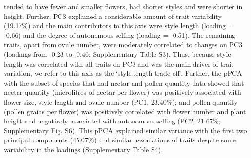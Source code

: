 \documentclass[12pt,a4paper,]{article}
\begin{document}
tended to have fewer and smaller flowers, had shorter styles and were
shorter in height. Further, PC3 explained a considerable amount of trait
variability (19.17\%) and the main contributors to this axis were style
length (loading = -0.66) and the degree of autonomous selfing (loading =
-0.51). The remaining traits, apart from ovule number, were moderately
correlated to changes on PC3 (loadings from -0.23 to -0.46;
Supplementary Table S3). Thus, because style length was correlated with
all traits on PC3 and was the main driver of trait variation, we refer
to this axis as the `style length trade-off'. Further, the pPCA with the
subset of species that had nectar and pollen quantity data showed that
nectar quantity (microlitres of nectar per flower) was positively
associated with flower size, style length and ovule number (PC1,
23.40\%); and pollen quantity (pollen grains per flower) was positively
correlated with flower number and plant height and negatively associated
with autonomous selfing (PC2, 21.67\%; Supplementary Fig. S6). This pPCA
explained similar variance with the first two principal components
(45.07\%) and similar associations of traits despite some variability in
the loadings (Supplementary Table S4).
\end{document}
